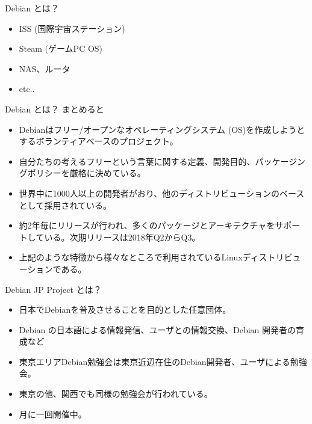 \begin{frame}{Debian とは？}

\begin{itemize}
\item ISS (国際宇宙ステーション)

\item Steam (ゲームPC OS)
\item NAS、ルータ
\item etc..
\end{itemize}

\end{frame}
\begin{frame}{Debian とは？}
まとめると\pause
\begin{itemize}[<+->]
\item Debianはフリー/オープンなオペレーティングシステム (OS)を作成しようとするボランティアベースのプロジェクト。
\item 自分たちの考えるフリーという言葉に関する定義、開発目的、パッケージングポリシーを厳格に決めている。
\item 世界中に1000人以上の開発者がおり、他のディストリビューションのベースとして採用されている。
\item 約2年毎にリリースが行われ、多くのパッケージとアーキテクチャをサポートしている。次期リリースは2018年Q2からQ3。
\item 上記のような特徴から様々なところで利用されているLinuxディストリビューションである。
\end{itemize}

\end{frame}

\begin{frame}{Debian JP Project とは？}
\pause
\begin{itemize}[<+->]
\item 日本でDebianを普及させることを目的とした任意団体。
\item Debian の日本語による情報発信、ユーザとの情報交換、Debian 開発者の育成など
\item 東京エリアDebian勉強会は東京近辺在住のDebian開発者、ユーザによる勉強会。
\item 東京の他、関西でも同様の勉強会が行われている。
\item 月に一回開催中。
\end{itemize}

\end{frame}

